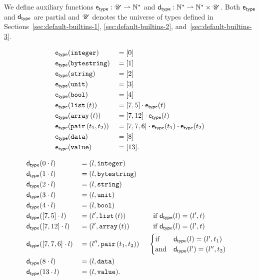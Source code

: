 \noindent We define auxiliary functions $\etype: \Uni \rightharpoonup \N^*$ and
$\dtype: \N^* \rightharpoonup \N^* \times \Uni$. Both $\etype$ and $\dtype$ are
partial and $\Uni$ denotes the universe of types defined in
Sections~\ref{sec:default-builtins-1}, \ref{sec:default-builtins-2},
and~\ref{sec:default-builtins-3}.

\begin{alignat*}{2}
  &\etype(\ty{integer})      &&= [0]  \\
  &\etype(\ty{bytestring})   &&= [1]  \\
  &\etype(\ty{string})       &&= [2]  \\
  &\etype(\ty{unit})         &&= [3]  \\
  &\etype(\ty{bool})         &&= [4]  \\
  &\etype(\listOf{t})        &&= [7,5] \cdot \etype(t) \\
  &\etype(\arrayOf{t})       &&= [7,12] \cdot \etype(t) \\
  &\etype(\pairOf{t_1}{t_2}) &&= [7,7,6] \cdot \etype(t_1) \cdot \etype(t_2)\\
  &\etype(\ty{data})         &&= [8]\\
  &\etype(\ty{value})        &&= [13].
\end{alignat*}

\begin{alignat*}{3}
 &\dtype(0 \cdot l) &&= (l, \ty{integer})    \\
 &\dtype(1 \cdot l) &&= (l, \ty{bytestring}) \\
 &\dtype(2 \cdot l) &&= (l, \ty{string})    \\
 &\dtype(3 \cdot l) &&= (l, \ty{unit})       \\
 &\dtype(4 \cdot l) &&= (l, \ty{bool})       \\
 &\dtype([7,5] \cdot l) &&= (l', \listOf{t}) &&\quad \text{if $\dtype(l) = (l', t)$}\\
 &\dtype([7,12] \cdot l) &&= (l', \arrayOf{t}) &&\quad \text{if $\dtype(l) = (l', t)$}\\
 &\dtype([7,7,6] \cdot l) &&= (l'', \pairOf{t_1}{t_2})
  &&\ \begin{cases}
      \text{if} & \dtype(l) = (l', t_1)\\
      \text{and} & \dtype(l') = (l'', t_2)
    \end{cases}\\
  &\dtype(8 \cdot l) &&= (l, \ty{data})\\
  &\dtype(13 \cdot l) &&= (l, \ty{value}).
\end{alignat*}

